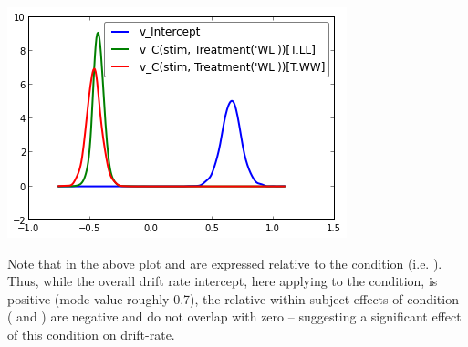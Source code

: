 \documentclass[letterpaper,10pt,english]{article}
\begin{document}
\includegraphics[scale=.7]{hddm_demo_fig_07.png}

Note that in the above plot  and  are expressed relative to the  condition (i.e. ). Thus, while the overall drift rate intercept, here applying to the  condition, is positive (mode value roughly 0.7), the relative within subject effects of condition ( and ) are negative and do not overlap with zero -- suggesting a significant effect of this condition on drift-rate.
\end{document}
